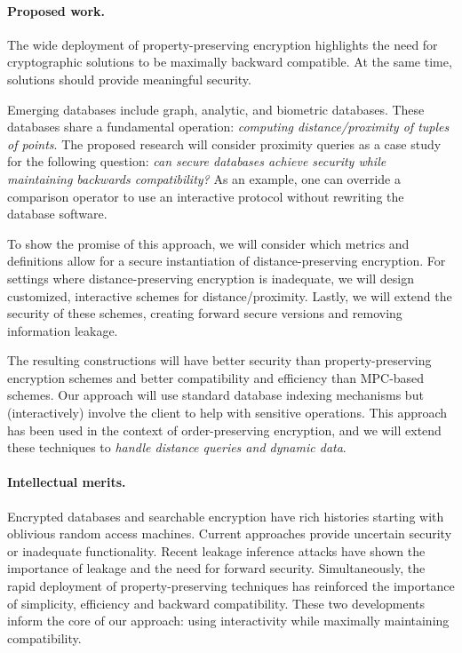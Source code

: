 \documentclass[11pt]{article}
\begin{document}
\paragraph{Proposed work.}
The wide deployment of property-preserving encryption highlights the need for cryptographic solutions to be maximally backward compatible.  At the same time, solutions should provide meaningful security.

Emerging databases include graph, analytic, and
biometric databases. These databases share a fundamental operation: {\em
computing distance/proximity of tuples of points}. The proposed research will
consider proximity queries as a case study for the following question: \emph{can secure databases achieve security while maintaining backwards compatibility?}  As an example, one can override a comparison operator to use an interactive protocol without rewriting the database software.

To show the promise of this approach, we will consider which metrics and definitions allow for a secure instantiation of distance-preserving encryption. For settings where distance-preserving encryption is inadequate, we will design
customized, interactive schemes for distance/proximity. Lastly, we will extend the security of these schemes, creating forward secure versions and removing information leakage.

The resulting constructions will have
better security than property-preserving encryption schemes and better compatibility and 
efficiency than MPC-based schemes. Our approach will use standard database indexing mechanisms but (interactively) involve the
client to help with sensitive operations. This approach has been used in the
context of order-preserving encryption, and we will extend these techniques to
{\em handle distance queries and dynamic data}.

%
%

\paragraph{Intellectual merits.}  
Encrypted databases and searchable encryption have rich histories starting with  oblivious random access machines.  Current approaches provide uncertain security or inadequate functionality.  Recent
leakage inference attacks have shown the importance of leakage and the need for forward
security.  Simultaneously, the rapid deployment of property-preserving
techniques has reinforced the importance of simplicity, efficiency and backward
compatibility.  These two developments inform the core of our approach: using
interactivity while maximally maintaining compatibility.
\end{document}
